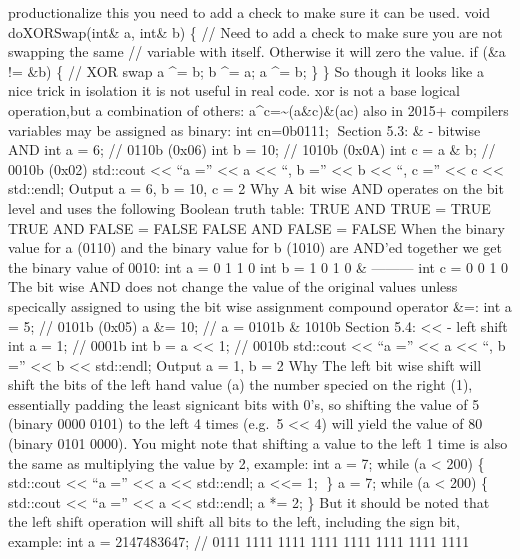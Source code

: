 productionalize this you need to add a check to make sure it can be
used. void doXORSwap(int\& a, int\& b) \{ // Need to add a check to make
sure you are not swapping the same // variable with itself. Otherwise it
will zero the value. if (\&a != \&b) \{ // XOR swap a \^{}= b; b \^{}=
a; a \^{}= b; \} \} So though it looks like a nice trick in isolation it
is not useful in real code. xor is not a base logical operation,but a
combination of others: a\^{}c=\textasciitilde(a\&c)\&(a\textbar c) also
in 2015+ compilers variables may be assigned as binary: int cn=0b0111;
Section 5.3: \& - bitwise AND int a = 6; // 0110b (0x06) int b = 10; //
1010b (0x0A) int c = a \& b; // 0010b (0x02) std::cout
\textless\textless{} ``a ='' \textless\textless{} a \textless\textless{}
``, b ='' \textless\textless{} b \textless\textless{} ``, c =''
\textless\textless{} c \textless\textless{} std::endl; Output a = 6, b =
10, c = 2 Why A bit wise AND operates on the bit level and uses the
following Boolean truth table: TRUE AND TRUE = TRUE TRUE AND FALSE =
FALSE FALSE AND FALSE = FALSE When the binary value for a (0110) and the
binary value for b (1010) are AND'ed together we get the binary value of
0010: int a = 0 1 1 0 int b = 1 0 1 0 \& --------- int c = 0 0 1 0 The
bit wise AND does not change the value of the original values unless
specically assigned to using the bit wise assignment compound operator
\&=: int a = 5; // 0101b (0x05) a \&= 10; // a = 0101b \& 1010b Section
5.4: \textless\textless{} - left shift int a = 1; // 0001b int b = a
\textless\textless{} 1; // 0010b std::cout \textless\textless{} ``a =''
\textless\textless{} a \textless\textless{} ``, b =''
\textless\textless{} b \textless\textless{} std::endl; Output a = 1, b =
2 Why The left bit wise shift will shift the bits of the left hand value
(a) the number specied on the right (1), essentially padding the least
signicant bits with 0's, so shifting the value of 5 (binary 0000 0101)
to the left 4 times (e.g.~5 \textless\textless{} 4) will yield the value
of 80 (binary 0101 0000). You might note that shifting a value to the
left 1 time is also the same as multiplying the value by 2, example: int
a = 7; while (a \textless{} 200) \{ std::cout \textless\textless{} ``a
='' \textless\textless{} a \textless\textless{} std::endl; a
\textless\textless= 1; \} a = 7; while (a \textless{} 200) \{ std::cout
\textless\textless{} ``a ='' \textless\textless{} a \textless\textless{}
std::endl; a *= 2; \} But it should be noted that the left shift
operation will shift all bits to the left, including the sign bit,
example: int a = 2147483647; // 0111 1111 1111 1111 1111 1111 1111 1111

